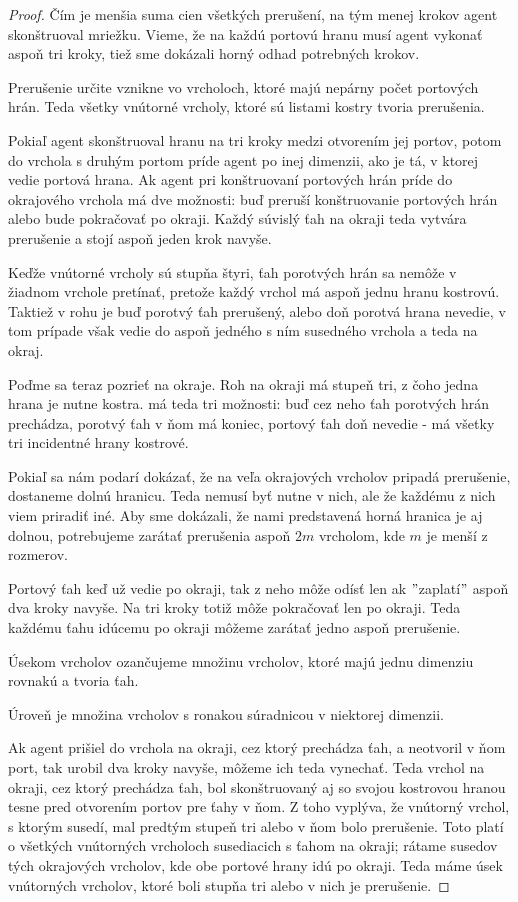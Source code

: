 \begin{proof}
Čím je menšia suma cien všetkých prerušení, na tým menej krokov agent
skonštruoval mriežku.
Vieme, že na každú portovú hranu musí agent vykonať aspoň tri kroky, tiež
sme dokázali horný odhad potrebných krokov.

Prerušenie určite vznikne vo vrcholoch, ktoré majú nepárny počet portových
hrán. Teda všetky vnútorné vrcholy, ktoré sú listami kostry tvoria
prerušenia.

Pokiaľ agent skonštruoval hranu na tri kroky medzi otvorením jej portov,
potom do vrchola s druhým portom príde agent po inej dimenzii, ako je tá,
v ktorej vedie portová hrana. Ak agent pri konštruovaní portových hrán príde
do okrajového vrchola má dve možnosti: buď preruší konštruovanie portových
hrán alebo bude pokračovať po okraji. Každý súvislý ťah na okraji teda
vytvára prerušenie a stojí aspoň jeden krok navyše.

Keďže vnútorné vrcholy sú stupňa štyri, ťah porotvých hrán sa nemôže v
žiadnom vrchole pretínať, pretože každý vrchol má aspoň jednu hranu kostrovú.
Taktiež v rohu je buď porotvý ťah prerušený, alebo doň porotvá hrana
nevedie, v tom prípade však vedie do aspoň jedného s ním susedného vrchola a
teda na okraj.

Poďme sa teraz pozrieť na okraje. Roh na okraji má stupeň tri, z čoho jedna
hrana je nutne kostra. má teda tri možnosti: buď cez neho ťah porotvých hrán
prechádza, porotvý ťah v ňom má koniec, portový ťah doň nevedie - má všetky
tri incidentné hrany kostrové.

Pokiaľ sa nám podarí dokázať, že na veľa okrajových vrcholov pripadá
prerušenie, dostaneme dolnú hranicu. Teda nemusí byť nutne v nich, ale že 
každému z nich viem priradiť iné. Aby sme dokázali, že nami predstavená
horná hranica je aj dolnou, potrebujeme zarátať prerušenia aspoň $2m$
vrcholom, kde $m$ je menší z rozmerov.

Portový ťah keď už vedie po okraji, tak z neho môže odísť len ak
$"$zaplatí$"$ aspoň dva kroky navyše. Na tri kroky totiž môže pokračovať len
po okraji. Teda každému ťahu idúcemu po okraji môžeme zarátať jedno aspoň
prerušenie.

\begin{ozn}
Úsekom vrcholov ozančujeme množinu vrcholov, ktoré majú jednu dimenziu
rovnakú a tvoria ťah.

Úroveň je množina vrcholov s ronakou súradnicou v niektorej dimenzii.
\end{ozn}

Ak agent prišiel do vrchola na okraji, cez ktorý prechádza ťah, a neotvoril
v ňom port, tak urobil dva kroky navyše, môžeme ich teda vynechať. Teda vrchol
na okraji, cez ktorý prechádza ťah, bol skonštruovaný aj so svojou kostrovou 
hranou tesne pred otvorením portov pre ťahy v ňom. Z toho vyplýva, že
vnútorný vrchol, s ktorým susedí, mal predtým stupeň tri alebo v ňom bolo
prerušenie. Toto platí o všetkých vnútorných vrcholoch susediacich s ťahom
na okraji; rátame susedov tých okrajových vrcholov, kde obe portové hrany
idú po okraji. Teda máme úsek vnútorných vrcholov, ktoré boli stupňa tri
alebo v nich je prerušenie.



\end{proof}
